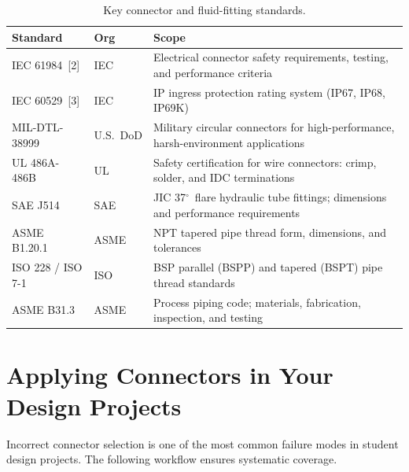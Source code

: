 \begin{table}[htbp]
\centering\small
\begin{tabularx}{\textwidth}{l l >{\raggedright\arraybackslash}X}
  \toprule
  \textbf{Standard} & \textbf{Org} & \textbf{Scope} \\
  \midrule
  IEC 61984~[2] & IEC & Electrical connector safety requirements, testing, and performance criteria \\
  IEC 60529~[3] & IEC & IP ingress protection rating system (IP67, IP68, IP69K) \\
  MIL-DTL-38999 & U.S.\ DoD & Military circular connectors for high-performance, harsh-environment applications \\
  UL 486A-486B & UL & Safety certification for wire connectors: crimp, solder, and IDC terminations \\
  SAE J514 & SAE & JIC 37$^{\circ}$\ flare hydraulic tube fittings; dimensions and performance requirements \\
  ASME B1.20.1 & ASME & NPT tapered pipe thread form, dimensions, and tolerances \\
  ISO 228 / ISO 7-1 & ISO & BSP parallel (BSPP) and tapered (BSPT) pipe thread standards \\
  ASME B31.3 & ASME & Process piping code; materials, fabrication, inspection, and testing \\
  \bottomrule
\end{tabularx}
\caption{Key connector and fluid-fitting standards.}
\end{table}


\section{Applying Connectors in Your Design Projects}

Incorrect connector selection is one of the most common failure modes in student design projects. The following workflow ensures systematic coverage.

